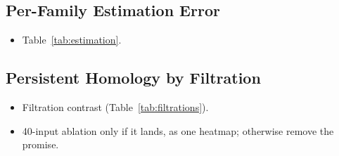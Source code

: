 \documentclass[twoside]{article}
\newcommand{\new}[1]{\textcolor{green!45!black}{#1}}   %
\begin{document}
\begin{table}[h]
\caption{Skill per family, $180$ patterns each ($179$ for ring). ``$\Delta$'' is ParamNet $-$ minimum contrast on the
same patterns, given the predicted and the true family, so minimum contrast's own skill is ParamNet's minus $\Delta$.
``$^\dagger$'' marks the families with no closed-form $K$: minimum contrast never selects them, and given the true
family it falls back to the training median. Skill can exceed $1$, because on a single replicate a fit can score
better than the true model. Intervals are $95\%$ bootstrap over patterns; higher skill and positive $\Delta$ favour
ParamNet.}
\label{tab:families-skill}
\begin{center}
\footnotesize
\setlength{\tabcolsep}{3.5pt}

\end{center}
\end{table}

\subsection{Per-Family Estimation Error}
\label{app:estimation}
\begin{itemize}
  \item Table~\ref{tab:estimation}.
\end{itemize}

\begin{table}[h]
\caption{\new{Estimation error per family and estimator, given the true family. Cells are
$\mathrm{RMSE}(\log\theta)/\mathrm{s.d.}$ averaged over the family's targets, where $1$ is the error of predicting
the training mean. ``Val'' is the validation split; ``All'' is every test pattern; ``$\tau{=}0.5$'' and
``$\tau{=}0.9$'' restrict to the structured regime at that detection power. ``$\star$'' marks the lowest validation
error, the estimator a per-family selection rule would pick. Intervals are $95\%$ over test $\theta$; lower is
better. Every learner beats minimum contrast on every family.}}
\label{tab:estimation}
\begin{center}
\scriptsize

\end{center}
\end{table}

\subsection{Persistent Homology by Filtration}
\label{app:filtrations}
\begin{itemize}
  \item Filtration contrast (Table~\ref{tab:filtrations}).
  \item 40-input ablation only if it lands, as one heatmap; otherwise remove the promise.
\end{itemize}
\end{document}
